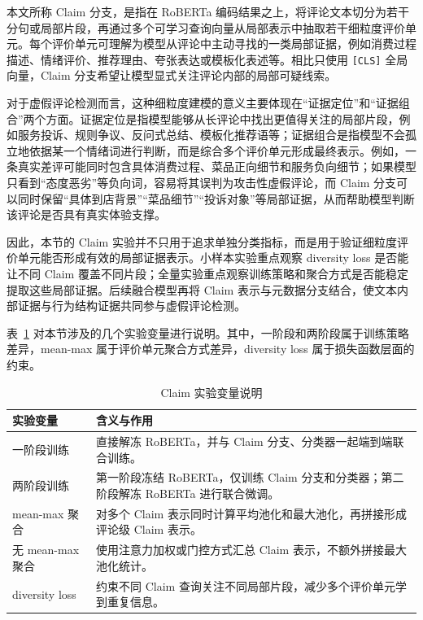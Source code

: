 \documentclass[UTF8,oneside,openright,fontset=none]{ctexbook}
\numberwithin{equation}{chapter}
\begin{document}
本文所称 Claim 分支，是指在 RoBERTa 编码结果之上，将评论文本切分为若干分句或局部片段，再通过多个可学习查询向量从局部表示中抽取若干细粒度评价单元。每个评价单元可理解为模型从评论中主动寻找的一类局部证据，例如消费过程描述、情绪评价、推荐理由、夸张表达或模板化表述等。相比只使用 \texttt{[CLS]} 全局向量，Claim 分支希望让模型显式关注评论内部的局部可疑线索。

对于虚假评论检测而言，这种细粒度建模的意义主要体现在“证据定位”和“证据组合”两个方面。证据定位是指模型能够从长评论中找出更值得关注的局部片段，例如服务投诉、规则争议、反问式总结、模板化推荐语等；证据组合是指模型不会孤立地依据某一个情绪词进行判断，而是综合多个评价单元形成最终表示。例如，一条真实差评可能同时包含具体消费过程、菜品正向细节和服务负向细节；如果模型只看到“态度恶劣”等负向词，容易将其误判为攻击性虚假评论，而 Claim 分支可以同时保留“具体到店背景”“菜品细节”“投诉对象”等局部证据，从而帮助模型判断该评论是否具有真实体验支撑。

因此，本节的 Claim 实验并不只用于追求单独分类指标，而是用于验证细粒度评价单元能否形成有效的局部证据表示。小样本实验重点观察 diversity loss 是否能让不同 Claim 覆盖不同片段；全量实验重点观察训练策略和聚合方式是否能稳定提取这些局部证据。后续融合模型再将 Claim 表示与元数据分支结合，使文本内部证据与行为结构证据共同参与虚假评论检测。

表~\ref{tab:claim-setting} 对本节涉及的几个实验变量进行说明。其中，一阶段和两阶段属于训练策略差异，mean-max 属于评价单元聚合方式差异，diversity loss 属于损失函数层面的约束。

\begin{table}[htbp]
  \centering
  \caption{Claim 实验变量说明}
  \label{tab:claim-setting}
  \begin{tabularx}{\textwidth}{lX}
    \toprule
    实验变量 & 含义与作用 \\
    \midrule
    一阶段训练 & 直接解冻 RoBERTa，并与 Claim 分支、分类器一起端到端联合训练。 \\
    两阶段训练 & 第一阶段冻结 RoBERTa，仅训练 Claim 分支和分类器；第二阶段解冻 RoBERTa 进行联合微调。 \\
    mean-max 聚合 & 对多个 Claim 表示同时计算平均池化和最大池化，再拼接形成评论级 Claim 表示。 \\
    无 mean-max 聚合 & 使用注意力加权或门控方式汇总 Claim 表示，不额外拼接最大池化统计。 \\
    diversity loss & 约束不同 Claim 查询关注不同局部片段，减少多个评价单元学到重复信息。 \\
    \bottomrule
  \end{tabularx}
\end{table}
\end{document}
